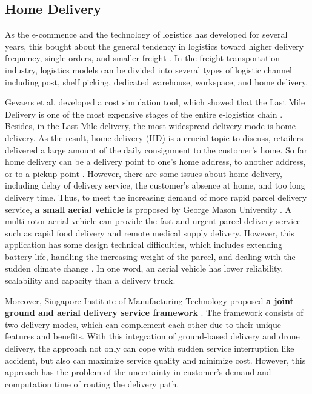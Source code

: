 \documentclass[12pt]{ksthesis}
\begin{document}
\begin{thesis}
{\section{Home Delivery}
As the e-commence and the technology of logistics has developed for several years, this bought about the general tendency in logistics toward higher delivery frequency, single orders, and smaller freight \cite{Visser2014}. In the freight transportation industry, logistics models can be divided into several types of logistic channel including post, shelf picking, dedicated warehouse, workspace, and home delivery.

Gevaers et al. developed a cost simulation tool, which showed that the Last Mile Delivery is one of the most expensive stages of the entire e-logistics chain \cite{Gevaers2014}. Besides, in the Last Mile delivery, the most widespread delivery mode is home delivery. As the result, home delivery (HD) is a crucial topic to discuss, retailers delivered a large amount of the daily consignment to the customer’s home. So far home delivery can be a delivery point to one’s home address, to another address, or to a pickup point  \cite{Zhou2016}. However, there are some issues about home delivery, including delay of delivery service, the customer’s absence at home, and too long delivery time. Thus, to meet the increasing demand of more rapid parcel delivery service, \textbf{a small aerial vehicle} is proposed by George Mason University \cite{Ali2015}. A multi-rotor aerial vehicle can provide the fast and urgent parcel delivery service such as rapid food delivery and remote medical supply delivery. However, this application has some design technical difficulties, which includes extending battery life, handling the increasing weight of the parcel, and dealing with the sudden climate change \cite{Ali2015}. In one word, an aerial vehicle has lower reliability, scalability and capacity than a delivery truck.

Moreover, Singapore Institute of Manufacturing Technology proposed \textbf{a joint ground and aerial delivery service framework} \cite{Sawadsitang2018} . The framework consists of two delivery modes, which can complement each other due to their unique features and benefits. With this integration of ground-based delivery and drone delivery, the approach not only can cope with sudden service interruption like accident, but also can maximize service quality and minimize cost. However, this approach has the problem of the uncertainty in customer’s demand and computation time of routing the delivery path. 

}
\end{thesis}
\end{document}
